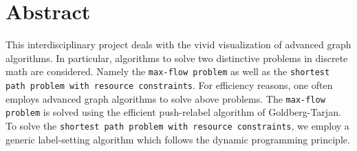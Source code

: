 \cleardoublepage

\section*{Abstract}
This interdisciplinary project deals with the vivid visualization of advanced graph algorithms. In particular, algorithms to solve two distinctive problems in discrete math are considered. Namely the \texttt{max-flow problem} as well as the \texttt{shortest path problem with resource constraints}.
For efficiency reasons, one often employs advanced graph algorithms to solve above problems. The \texttt{max-flow problem} is solved using the efficient push-relabel algorithm of Goldberg-Tarjan. To solve the \texttt{shortest path problem with resource constraints}, we employ a generic label-setting algorithm which follows the dynamic programming principle.
